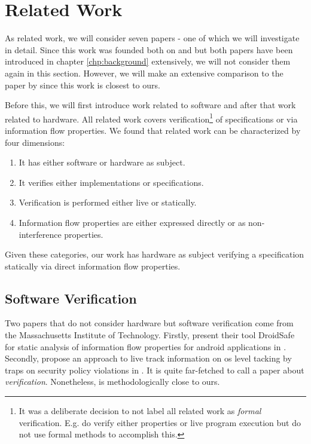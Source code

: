 
\chapter{Related Work}
\label{chp:related-work}

As related work, we will consider seven papers - one of which we will investigate in detail.
Since this work was founded both on  \cite{Reid17} and  \cite{Ferraiuolo17} but both papers have been introduced in chapter \ref{chp:background} extensively, we will not consider them again in this section.
However, we will make an extensive comparison to the paper  \cite{BradfieldS16} by \citeauthor{BradfieldS16} since this work is closest to ours.

Before this, we will first introduce work related to software and after that work related to hardware.
All related work covers verification\footnote{%
    It was a deliberate decision to not label all related work as \textit{formal} verification.
    E.g. \cite{Zhang15,SuhLZD04} do verify either properties or live program execution but do not use formal methods to accomplish this.
} of specifications or via information flow properties.
We found that related work can be characterized by four dimensions:
\begin{enumerate}
    \item It has either software or hardware as subject.
    \item It verifies either implementations or specifications.
    \item Verification is performed either live or statically.
    \item Information flow properties are either expressed directly or as non-interference properties.
\end{enumerate}

Given these categories, our work has hardware as subject verifying a specification statically via direct information flow properties.

\section{Software Verification}

Two papers that do not consider hardware but software verification come from the Massachusetts Institute of Technology.
Firstly, \citeauthor{GordonKPGNR15} present their tool DroidSafe for static analysis of information flow properties for android applications in  \cite{GordonKPGNR15}.
Secondly, \citeauthor{SuhLZD04} propose an approach to live track information on \gls{os} level tacking by traps on security policy violations in  \cite{SuhLZD04}.
It is quite far-fetched to call \cite{SuhLZD04} a paper about \textit{verification}.
Nonetheless, is methodologically close to ours.

